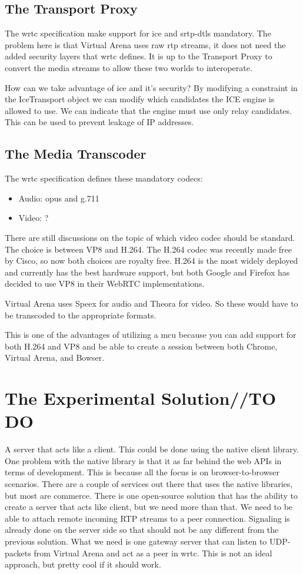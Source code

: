 \subsection{The Transport Proxy}
The \gls{wrtc} specification make support for \gls{ice} and \gls{srtp}-{dtls} mandatory. The problem here is that Virtual Arena uses raw \gls{rtp} streams, it does not need the added security layers that \gls{wrtc} defines. It is up to the Transport Proxy to convert the media streams to allow these two worlds to interoperate. 

How can we take advantage of \gls{ice} and it's security? By modifying a constraint in the IceTransport object we can modify which candidates the ICE engine is allowed to use. We can indicate that the engine must use only relay candidates. This can be used to prevent leakage of IP addresses.


\subsection{The Media Transcoder}
The \gls{wrtc} specification defines these mandatory codecs:
\begin{itemize}
    \item Audio: opus and g.711
    \item Video: ?
\end{itemize}

There are still discussions on the topic of which video codec should be standard. The choice is between VP8 and H.264. The H.264 codec was recently made free by Cisco, so now both choices are royalty free. H.264 is the most widely deployed and currently has the best hardware support, but both Google and Firefox has decided to use VP8 in their WebRTC implementations.

Virtual Arena uses Speex for audio and Theora for video. So these would have to be transcoded to the appropriate formats.

This is one of the advantages of utilizing a \gls{mcu} because you can add support for both H.264 and VP8 and be able to create a session between  both Chrome, Virtual Arena, and Bowser.


\section{The Experimental Solution//TO DO}
A server that acts like a client. This could be done using the native client library. One problem with the native library is that it as far behind the web APIs in terms of development. This is because all the focus is on browser-to-browser scenarios. There are a couple of services out there that uses the native libraries, but most are commerce. There is one open-source solution that has the ability to create a server that acts like client, but we need more than that. We need to be able to attach remote incoming RTP streams to a peer connection. Signaling is already done on the server side so that should not be any different from the previous solution. What we need is one gateway server that can listen to UDP-packets from Virtual Arena and act as a peer in \gls{wrtc}. This is not an ideal approach, but pretty cool if it should work.


